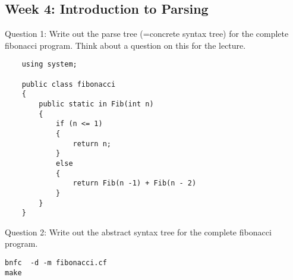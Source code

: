 \documentclass{article}
\theoremstyle{theorem}
\theoremstyle{definition}
\theoremstyle{remark}
\begin{document}
\subsection{Week 4: Introduction to Parsing}
Question 1: Write out the parse tree (=concrete syntax tree) for the complete fibonacci program. Think about a question on this for the lecture.
\begin{lstlisting}
	using system;
	
	public class fibonacci
	{
		public static in Fib(int n)
		{
			if (n <= 1)
			{
				return n;
			}
			else
			{
				return Fib(n -1) + Fib(n - 2)
			}
		}
	}
\end{lstlisting}
Question 2: Write out the abstract syntax tree for the complete fibonacci program. 
\begin{lstlisting}
bnfc  -d -m fibonacci.cf
make
\end{lstlisting}
\end{document}
